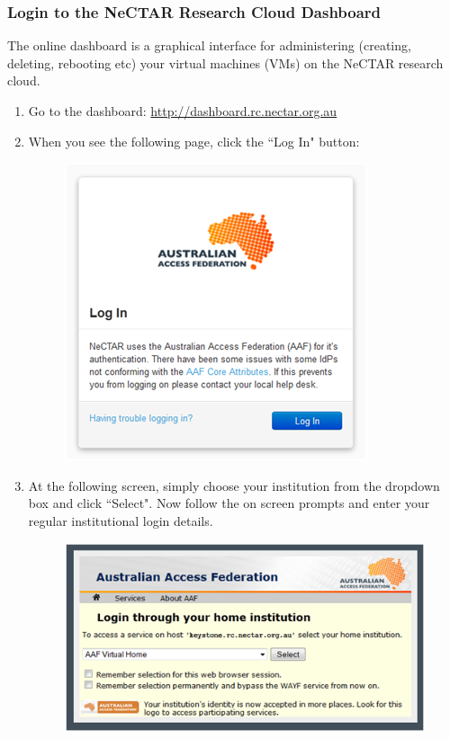 \subsubsection{Login to the NeCTAR Research Cloud Dashboard}
The online dashboard is a graphical interface for administering (creating,
deleting, rebooting etc) your virtual machines (VMs) on the NeCTAR research
cloud.

\begin{enumerate}
  \item Go to the dashboard: \url{http://dashboard.rc.nectar.org.au}
  \item When you see the following page, click the ``Log In" button:
  \begin{figure}[H]
    \centering
    \includegraphics[scale=0.5]{post-workshop/nectar/aaf_login.png}
    \label{fig:aaf_login}
  \end{figure}
  \item At the following screen, simply choose your institution from the
  dropdown box and click ``Select". Now follow the on screen prompts and enter
  your regular institutional login details.
  \begin{figure}[H]
    \centering
    \includegraphics[scale=0.5]{post-workshop/nectar/aaf_home_institute.png}

\end{figure}
\end{enumerate}
